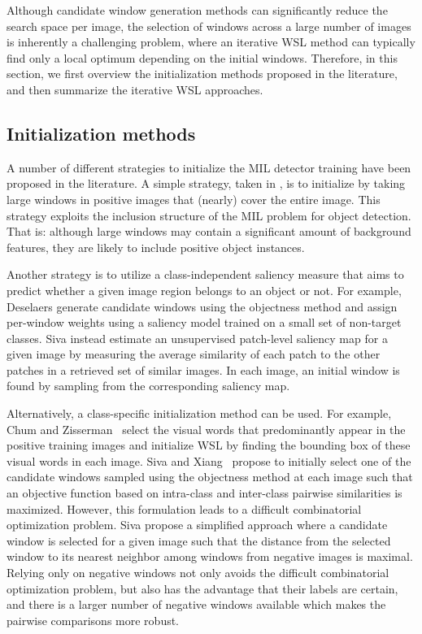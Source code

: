 \documentclass[10pt,journal,cspaper,final,twocolumn,compsoc]{./IEEEtran}
\begin{document}
Although candidate window generation methods can
significantly reduce the search space per image, the
selection of windows across a large number of images is
inherently a challenging problem, where an iterative WSL
method can typically find only a local optimum depending
on the initial windows. Therefore, in 
this section, we first overview the
initialization methods proposed in the literature, and
then summarize the iterative WSL approaches.

\subsection{Initialization methods}

A number of different strategies to initialize the MIL
detector training have been proposed in the literature.  A
simple strategy,  \eg  taken in
\cite{pandey11iccv,russakovsky12eccv,kim09nips}, is to initialize
by taking large windows in positive images that (nearly)
cover the entire image. This strategy exploits the
inclusion structure of the MIL problem for object
detection. That is:  although large windows may contain a
significant amount of background features, they are likely
to include positive object instances.

Another strategy is to utilize a class-independent 
saliency measure that aims to predict whether a given
image region belongs to an object or not. For example,
Deselaers \etal\cite{deselaers12ijcv} generate candidate windows using
the objectness method \cite{alexe12pami} and assign
per-window weights using a saliency model trained on a
small set of non-target classes.
Siva \etal\cite{siva13cvpr} instead estimate an unsupervised
patch-level saliency map for a given image by measuring
the average similarity of each patch to the other patches
in a retrieved set of similar images. In each image, an initial window  is found by sampling from the corresponding
saliency map.

Alternatively, a class-specific initialization method can
be used. For example, Chum and Zisserman~\cite{chum07cvpr} select the
visual words that predominantly appear in the positive
training images and initialize WSL by finding the 
bounding box of these visual words in each image.
Siva and Xiang~\cite{siva11iccv} propose to initially select one of the
candidate windows sampled using the objectness method at
each image such that an objective function based on
intra-class and inter-class pairwise similarities is
maximized.  However, this formulation leads to a difficult
combinatorial optimization problem. Siva \etal\cite{siva12eccv}
propose a simplified approach where a candidate window is
selected for a given image such that the distance from the
selected window to its nearest neighbor among windows from
negative images is maximal.  Relying only on negative windows
not only avoids the difficult combinatorial optimization
problem, but also has the advantage that their labels are
certain, 
and there is a larger number of negative windows available
which makes the pairwise comparisons more robust. 
\end{document}
